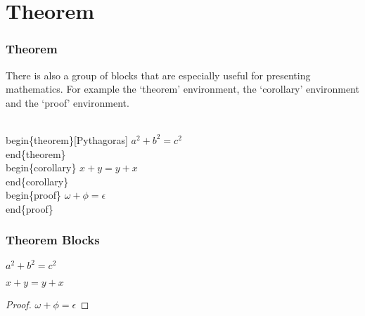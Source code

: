 \section{Theorem}
\label{theoremCode}
\begin{frame}\frametitle{Theorem}
  There is also a group of blocks that are especially useful for presenting mathematics. For example the ‘theorem’ environment, the ‘corollary’ environment and the ‘proof’ environment.
  \begin{semiverbatim}
    \\begin\{theorem\}[Pythagoras] \newline
      $ a^2 + b^2 = c^2$ \newline
    \\end\{theorem\} \newline
    \\begin\{corollary\} \newline
      $ x + y = y + x  $ \newline
    \\end\{corollary\} \newline
    \\begin\{proof\} \newline
      $\omega +\phi = \epsilon $ \newline
    \\end\{proof\}
  \end{semiverbatim}
\end{frame}

\label{theoremBlocks}
\begin{frame}\frametitle{Theorem Blocks}
  \begin{theorem}[Pythagoras] 
    $ a^2 + b^2 = c^2$
  \end{theorem}
  \begin{corollary}
    $ x + y = y + x  $
  \end{corollary}
  \begin{proof}
    $\omega +\phi = \epsilon $
  \end{proof}
\end{frame}